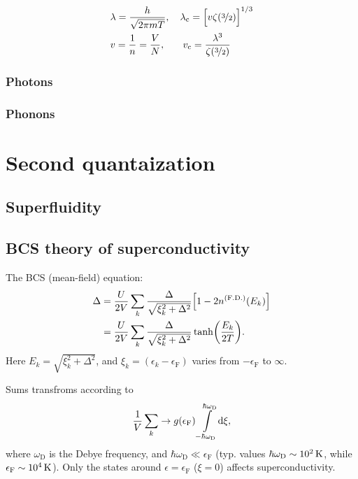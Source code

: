\documentclass[11pt,letter, swedish, english, twocolumn
]{article}
\newcommand{\lc}{\ensuremath{{\lambda_{\text{c}}}}}
\newcommand{\vc}{\ensuremath{{v_{\text{c}}}}}
\newcommand{\eF}{\ensuremath{{\epsilon_{\text{F}}}}}
\newcommand{\wD}{\ensuremath{{\omega_{\text{D}}}}}
\begin{document}
\begin{equation}
\begin{aligned}
&\lambda=\frac{h}{\sqrt{2\pi mT}}\qcomma 
\lc=\Big[v\zeta(\nicefrac{3}{2})\Big]^{1/3}\\
&v=\frac{1}{n}=\frac{V}{N},\hspace{18pt}
\vc=\frac{\lambda^3}{\zeta(\nicefrac{3}{2})}
\end{aligned}
\end{equation}


\subsubsection{Photons}

\subsubsection{Phonons}




\section{Second quantaization}

\subsection{Superfluidity}

\subsection{BCS theory of superconductivity}
The BCS (mean-field) equation:
\begin{equation}
\begin{aligned}
\Delta &= \frac{U}{2V}\sum_k \frac{\Delta}{\sqrt{\xi_k^2+\Delta^2}}
\qty[1-2n^{(\text{F.D.})}(E_k)]\\
&= \frac{U}{2V}\sum_k \frac{\Delta}{\sqrt{\xi_k^2+\Delta^2}}
\tanh(\frac{E_k}{2T}).
\end{aligned}
\end{equation}
Here $E_k=\sqrt{\xi_k^2+\Delta^2}$, and $\xi_k=(\epsilon_k-\eF)$ varies
from $-\eF$ to $\infty$.

Sums transfroms according to
\begin{equation}
\frac{1}{V}\sum_k \to g(\eF)\int_{-\hbar\wD}^{\hbar\wD}\!\rd\xi,
\end{equation}
where $\wD$ is the Debye frequency, and $\hbar\wD\ll\eF$ (typ. values
$\hbar\wD\sim\unit[10^2]{K}$, while $\eF\sim\unit[10^4]{K}$). Only the
states around $\epsilon=\eF$ ($\xi=0$) affects superconductivity. 
\end{document}
